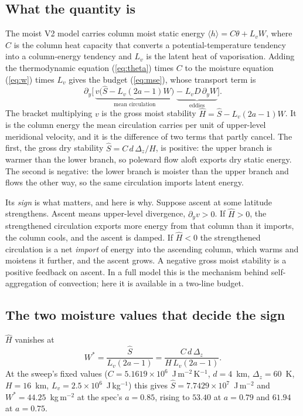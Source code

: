 \documentclass[11pt]{article}
\newcommand{\Hhat}{\hat{H}}
\newcommand{\Shat}{\hat{S}}
\newcommand{\Wstar}{W^{*}}
\newcommand{\py}{\partial_y}
\begin{document}
\subsection{What the quantity is}

The moist V2 model carries column moist static energy
$\langle h\rangle = C\theta + L_v W$, where $C$ is the column heat capacity that
converts a potential-temperature tendency into a column-energy tendency and
$L_v$ is the latent heat of vaporisation. Adding the thermodynamic equation
(\ref{eq:theta}) times $C$ to the moisture equation (\ref{eq:w}) times $L_v$
gives the budget (\ref{eq:mse}), whose transport term is
\begin{equation}
\py\Big[\,\underbrace{v\big(\Shat - L_v(2a-1)W\big)}_{\text{mean circulation}}
\;\underbrace{-\;L_v D\,\py W}_{\text{eddies}}\Big].
\end{equation}
The bracket multiplying $v$ is the gross moist stability
$\Hhat = \Shat - L_v(2a-1)W$. It is the column energy the mean circulation
carries per unit of upper-level meridional velocity, and it is the difference of
two terms that partly cancel. The first, the gross dry stability
$\Shat = C\,d\,\Delta_z/H$, is positive: the upper branch is warmer than the
lower branch, so poleward flow aloft exports dry static energy. The second is
negative: the lower branch is moister than the upper branch and flows the other
way, so the same circulation imports latent energy.

Its \emph{sign} is what matters, and here is why. Suppose ascent at some
latitude strengthens. Ascent means upper-level divergence, $\py v > 0$. If
$\Hhat > 0$, the strengthened circulation exports more energy from that column
than it imports, the column cools, and the ascent is damped. If $\Hhat < 0$ the
strengthened circulation is a net \emph{import} of energy into the ascending
column, which warms and moistens it further, and the ascent grows. A negative
gross moist stability is a positive feedback on ascent. In a full model this is
the mechanism behind self-aggregation of convection; here it is available in a
two-line budget.

\subsection{The two moisture values that decide the sign}

$\Hhat$ vanishes at
\begin{equation}
\Wstar = \frac{\Shat}{L_v(2a-1)} = \frac{C\,d\,\Delta_z}{H\,L_v(2a-1)} .
\label{eq:wstar}
\end{equation}
At the sweep's fixed values ($C = 5.1619\times10^{6}$~J\,m$^{-2}$\,K$^{-1}$,
$d = 4$~km, $\Delta_z = 60$~K, $H = 16$~km, $L_v = 2.5\times10^{6}$~J\,kg$^{-1}$)
this gives $\Shat = 7.7429\times10^{7}$~J\,m$^{-2}$ and
$\Wstar = 44.25$~kg\,m$^{-2}$ at the spec's $a = 0.85$, rising to
$53.40$ at $a = 0.79$ and $61.94$ at $a = 0.75$.
\end{document}
